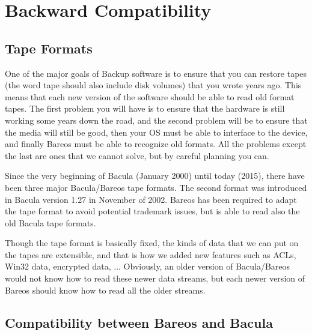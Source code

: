 \chapter{Backward Compatibility}
\label{backward-compatibility}

\section{Tape Formats}
\label{backward-compatibility-tape-format}


One of the major goals of Backup software is to ensure that you can restore
tapes (the word tape should also include disk volumes) that you wrote years
ago.  This means that each new version of the software should be able to read old
format tapes. The first problem you will have is to ensure that the
hardware is still working some years down the road, and the second
problem will be to ensure that the media will still be good, then
your OS must be able to interface to the device, and finally Bareos
must be able to recognize old formats.  All the problems except the
last are ones that we cannot solve, but by careful planning you can.

Since the very beginning of Bacula (January 2000) until today (2015),
there have been three major Bacula/Bareos tape formats.  The second format
was introduced in Bacula version 1.27 in November of 2002.
Bareos has been required to adapt the tape format to avoid potential trademark issues,
but is able to read also the old Bacula tape formats.

Though the tape format is basically fixed, the kinds of data that we can put on the
tapes are extensible, and that is how we added new features
such as ACLs, Win32 data, encrypted data, ...  Obviously, an older
version of Bacula/Bareos would not know how to read these newer data streams,
but each newer version of Bareos should know how to read all the
older streams.

%
%
%

\section{Compatibility between Bareos and Bacula}
\label{compat-bacula}

